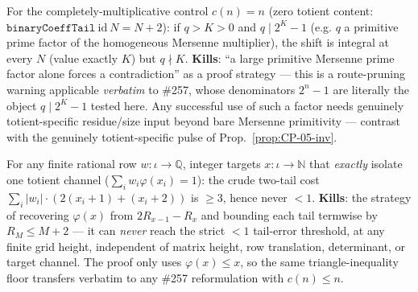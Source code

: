 \begin{obs}\label{prop:CP-03-kill}
For the completely-multiplicative control $c(n)=n$ (zero totient content:
$\mathtt{binaryCoeffTail}\ \mathrm{id}\ N = N{+}2$): if $q>K>0$ and $q\mid2^K-1$ (e.g. $q$ a
primitive prime factor of the homogeneous Mersenne multiplier), the shift is integral at every $N$
(value exactly $K$) but $q\nmid K$. \textbf{Kills}: ``a large primitive Mersenne prime factor
alone forces a contradiction'' as a proof strategy — this is a route-pruning warning applicable
\emph{verbatim} to \#257, whose denominators $2^n-1$ are literally the object $q\mid2^K-1$ tested
here. Any successful use of such a factor needs genuinely totient-specific residue/size input
beyond bare Mersenne primitivity — contrast with the genuinely totient-specific pulse of
Prop.~\ref{prop:CP-05-inv}.
\ \ \\
\end{obs}

\begin{obs}\label{prop:CP-04-kill}
For any finite rational row $w{:}\iota\to\mathbb Q$, integer targets $x{:}\iota\to\mathbb N$ that
\emph{exactly} isolate one totient channel ($\sum_i w_i\varphi(x_i)=1$): the crude two-tail cost
$\sum_i|w_i|\cdot(2(x_i{+}1)+(x_i{+}2))$ is $\ge3$, hence never $<1$. \textbf{Kills}: the strategy
of recovering $\varphi(x)$ from $2R_{x-1}-R_x$ and bounding each tail termwise by $R_M\le M{+}2$ —
it can \emph{never} reach the strict $<1$ tail-error threshold, at any finite grid height,
independent of matrix height, row translation, determinant, or target channel. The proof only uses
$\varphi(x)\le x$, so the same triangle-inequality floor transfers verbatim to any \#257
reformulation with $c(n)\le n$.
\ \ \\
\end{obs}

